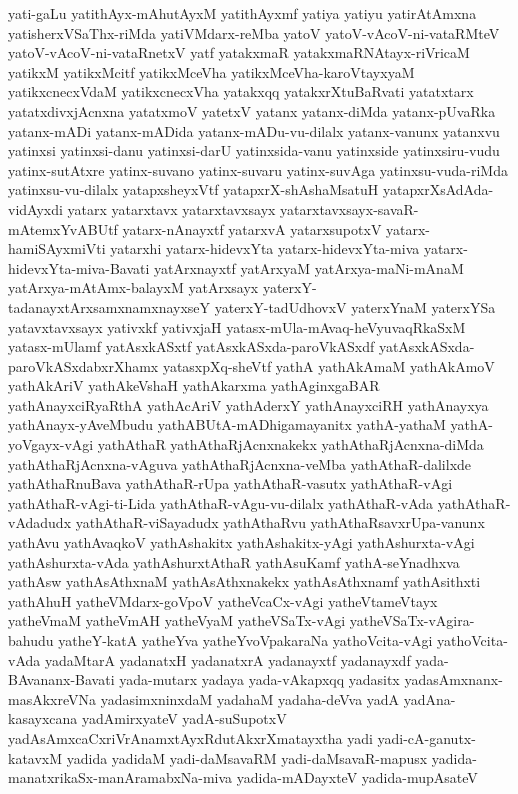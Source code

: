 {yati-gaLu
yatithAyx-mAhutAyxM
yatithAyxmf
yatiya
yatiyu
yatirAtAmxna
yatisherxVSaThx-riMda
yatiVMdarx-reMba
yatoV
yatoV-vAcoV-ni-vataRMteV
yatoV-vAcoV-ni-vataRnetxV
yatf
yatakxmaR
yatakxmaRNAtayx-riVricaM
yatikxM
yatikxMcitf
yatikxMceVha
yatikxMceVha-karoVtayxyaM
yatikxcnecxVdaM
yatikxcnecxVha
yatakxqq
yatakxrXtuBaRvati
yatatxtarx
yatatxdivxjAcnxna
yatatxmoV
yatetxV
yatanx
yatanx-diMda
yatanx-pUvaRka
yatanx-mADi
yatanx-mADida
yatanx-mADu-vu-dilalx
yatanx-vanunx
yatanxvu
yatinxsi
yatinxsi-danu
yatinxsi-darU
yatinxsida-vanu
yatinxside
yatinxsiru-vudu
yatinx-sutAtxre
yatinx-suvano
yatinx-suvaru
yatinx-suvAga
yatinxsu-vuda-riMda
yatinxsu-vu-dilalx
yatapxsheyxVtf
yatapxrX-shAshaMsatuH
yatapxrXsAdAda-vidAyxdi
yatarx
yatarxtavx
yatarxtavxsayx
yatarxtavxsayx-savaR-mAtemxYvABUtf
yatarx-nAnayxtf
yatarxvA
yatarxsupotxV
yatarx-hamiSAyxmiVti
yatarxhi
yatarx-hidevxYta
yatarx-hidevxYta-miva
yatarx-hidevxYta-miva-Bavati
yatArxnayxtf
yatArxyaM
yatArxya-maNi-mAnaM
yatArxya-mAtAmx-balayxM
yatArxsayx
yaterxY-tadanayxtArxsamxnamxnayxseY
yaterxY-tadUdhovxV
yaterxYnaM
yaterxYSa
yatavxtavxsayx
yativxkf
yativxjaH
yatasx-mUla-mAvaq-heVyuvaqRkaSxM
yatasx-mUlamf
yatAsxkASxtf
yatAsxkASxda-paroVkASxdf
yatAsxkASxda-paroVkASxdabxrXhamx
yatasxpXq-sheVtf
yathA
yathAkAmaM
yathAkAmoV
yathAkAriV
yathAkeVshaH
yathAkarxma
yathAginxgaBAR
yathAnayxciRyaRthA
yathAcAriV
yathAderxY
yathAnayxciRH
yathAnayxya
yathAnayx-yAveMbudu
yathABUtA-mADhigamayanitx
yathA-yathaM
yathA-yoVgayx-vAgi
yathAthaR
yathAthaRjAcnxnakekx
yathAthaRjAcnxna-diMda
yathAthaRjAcnxna-vAguva
yathAthaRjAcnxna-veMba
yathAthaR-dalilxde
yathAthaRnuBava
yathAthaR-rUpa
yathAthaR-vasutx
yathAthaR-vAgi
yathAthaR-vAgi-ti-Lida
yathAthaR-vAgu-vu-dilalx
yathAthaR-vAda
yathAthaR-vAdadudx
yathAthaR-viSayadudx
yathAthaRvu
yathAthaRsavxrUpa-vanunx
yathAvu
yathAvaqkoV
yathAshakitx
yathAshakitx-yAgi
yathAshurxta-vAgi
yathAshurxta-vAda
yathAshurxtAthaR
yathAsuKamf
yathA-seYnadhxva
yathAsw
yathAsAthxnaM
yathAsAthxnakekx
yathAsAthxnamf
yathAsithxti
yathAhuH
yatheVMdarx-goVpoV
yatheVcaCx-vAgi
yatheVtameVtayx
yatheVmaM
yatheVmAH
yatheVyaM
yatheVSaTx-vAgi
yatheVSaTx-vAgira-bahudu
yatheY-katA
yatheYva
yatheYvoVpakaraNa
yathoVcita-vAgi
yathoVcita-vAda
yadaMtarA
yadanatxH
yadanatxrA
yadanayxtf
yadanayxdf
yada-BAvananx-Bavati
yada-mutarx
yadaya
yada-vAkapxqq
yadasitx
yadasAmxnanx-masAkxreVNa
yadasimxninxdaM
yadahaM
yadaha-deVva
yadA
yadAna-kasayxcana
yadAmirxyateV
yadA-suSupotxV
yadAsAmxcaCxriVrAnamxtAyxRdutAkxrXmatayxtha
yadi
yadi-cA-ganutx-katavxM
yadida
yadidaM
yadi-daMsavaRM
yadi-daMsavaR-mapusx
yadida-manatxrikaSx-manAramabxNa-miva
yadida-mADayxteV
yadida-mupAsateV
}

